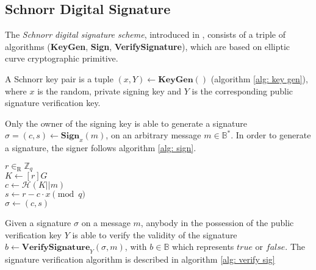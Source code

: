 \newpage

\subsection{Schnorr Digital Signature}
The \textit{Schnorr digital signature scheme}, introduced in \cite{Schnorr90}, consists of a triple of algorithms (\textbf{KeyGen}, \textbf{Sign}, \textbf{VerifySignature}), which are based on elliptic curve cryptographic primitive.

A Schnorr key pair is a tuple \( (x, Y) \leftarrow \mathbf{KeyGen}() \) (algorithm \ref{alg: key gen}), where $x$ is the random, private signing key and $Y$ is the corresponding public signature verification key.

Only the owner of the signing key is able to generate a signature \( \sigma = (c, s) \leftarrow \mathbf{Sign}_x (m) \), on an arbitrary message \( m \in \mathbb{B}^* \). In order to generate a signature, the signer follows algorithm \ref{alg: sign}.

\begin{algorithm}[H]
\DontPrintSemicolon
    \caption{\( \mathbf{Sign}_x (m) \)}
    \( r \in_\mathrm{R} \mathbb{Z}_q \) \\
    \( K \gets [r]G \) \\
    \( c \gets \mathcal{H}(K || m) \) \\
    \( s \gets r - c \cdot x \pmod q \) \\
    \( \sigma \gets (c, s) \) \\
    \Return{\( \sigma \)} 
\end{algorithm}


Given a signature $\sigma$ on a message $m$, anybody in the possession of the public verification key $Y$ is able to verify the validity of the signature \( b \leftarrow \mathbf{VerifySignature}_Y (\sigma, m) \), with \( b \in \mathbb{B} \) which represents $true$ or $false$. The signature verification algorithm is described in algorithm \ref{alg: verify sig}

